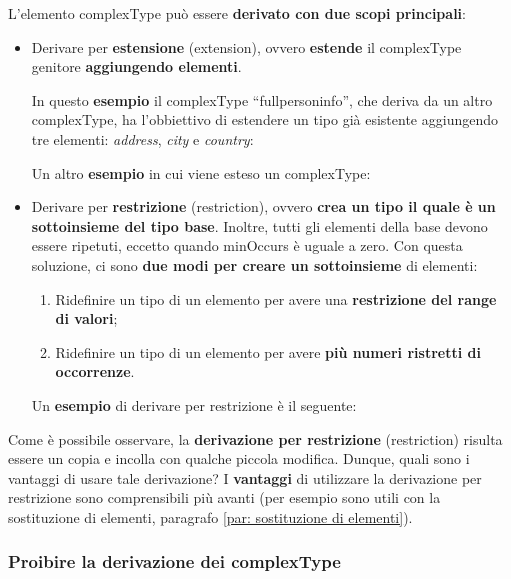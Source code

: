 \documentclass[a4paper]{article}
\newcommand{\dquotes}[1]{``#1''}
\begin{document}
	L'elemento \textsf{complexType} può essere \textbf{derivato con due scopi principali}:
	\begin{itemize}
		\item Derivare per \textbf{estensione} (\textsf{extension}), ovvero \textbf{estende} il \textsf{complexType} genitore \textbf{aggiungendo elementi}.
		
		In questo \textcolor{Green4}{\textbf{esempio}} il \textsf{complexType} \dquotes{\textsf{fullpersoninfo}}, che deriva da un altro \textsf{complexType}, ha l'obbiettivo di estendere un tipo già esistente aggiungendo tre elementi: \emph{address}, \emph{city} e \emph{country}:
		
		Un altro \textcolor{Green4}{\textbf{esempio}} in cui viene esteso un \textsf{complexType}:
		
		
		\item Derivare per \textbf{restrizione} (\textsf{restriction}), ovvero \textbf{crea un tipo il quale è un sottoinsieme del tipo base}. Inoltre, tutti gli elementi della base devono essere ripetuti, eccetto quando \textsf{minOccurs} è uguale a zero. Con questa soluzione, ci sono \textbf{due modi per creare un sottoinsieme} di elementi:
		\begin{enumerate}
			\item Ridefinire un tipo di un elemento per avere una \textbf{restrizione del range di valori};
			
			\item Ridefinire un tipo di un elemento per avere \textbf{più numeri ristretti di occorrenze}.
		\end{enumerate}
		Un \textcolor{Green4}{\textbf{esempio}} di derivare per restrizione è il seguente:
		
	\end{itemize}
	Come è possibile osservare, la \textbf{derivazione per restrizione} (\textsf{restriction}) risulta essere un copia e incolla con qualche piccola modifica. Dunque, quali sono i vantaggi di usare tale derivazione? I \textcolor{Green4}{\textbf{vantaggi}} di utilizzare la derivazione per restrizione sono comprensibili più avanti (per esempio sono utili con la sostituzione di elementi, paragrafo \ref{par: sostituzione di elementi}).\newpage
	
	\subsubsection{Proibire la derivazione dei \textsf{complexType}}
	
\end{document}
